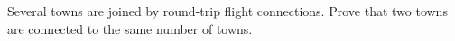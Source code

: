 Several towns are joined by round-trip flight connections. Prove that two towns are connected to the same number of towns.
